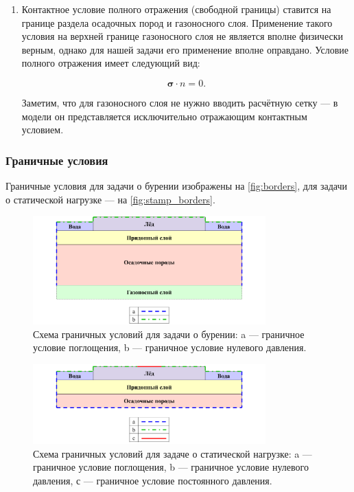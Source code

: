 \begin{enumerate}
    \item Контактное условие полного отражения (свободной границы) ставится на границе раздела осадочных пород и газоносного слоя. Применение такого условия на верхней границе газоносного слоя не является вполне физически верным, однако для нашей задачи его применение вполне оправдано. Условие полного отражения имеет следующий вид:

    \begin{equation*}
        \pmb{\sigma} \cdot n = 0 .
    \end{equation*}
    
    Заметим, что для газоносного слоя не нужно вводить расчётную сетку --- в модели он представляется исключительно отражающим контактным условием.
\end{enumerate}

\subsubsection{Граничные условия}

Граничные условия для задачи о бурении изображены на \autoref{fig:borders}, для задачи о статической нагрузке --- на \autoref{fig:stamp_borders}.

\begin{figure}[htb]
    \centering
    \includegraphics[width=0.8\textwidth]
    {images/gas_field/border_conds.png}
    \caption{Схема граничных условий для задачи о бурении: a --- граничное условие поглощения, b --- граничное условие нулевого давления.}
    \label{fig:borders}
\end{figure}

\begin{figure}[htb]
    \centering
    \includegraphics[width=0.8\textwidth]
    {images/stamp/stamp_border.png}
    \caption{Схема граничных условий для задаче о статической нагрузке: a --- граничное условие поглощения, b --- граничное условие нулевого давления, с --- граничное условие постоянного  давления.}
    \label{fig:stamp_borders}
\end{figure}

